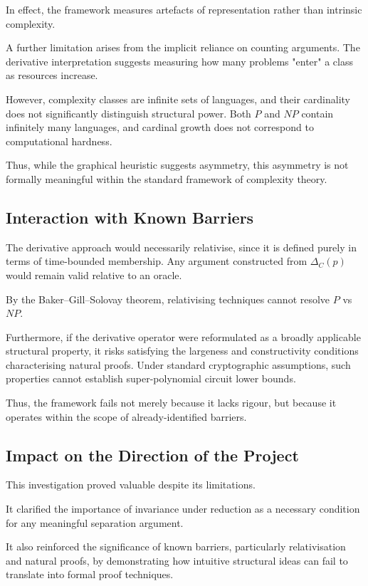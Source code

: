 \documentclass[12pt]{article}
\begin{document}
In effect, the framework measures artefacts of representation rather than intrinsic complexity.

A further limitation arises from the implicit reliance on counting arguments. The derivative interpretation suggests measuring how many problems "enter" a class as resources increase.

However, complexity classes are infinite sets of languages, and their cardinality does not significantly distinguish structural power. Both $P$ and $NP$ contain infinitely many languages, and cardinal growth does not correspond to computational hardness.

Thus, while the graphical heuristic suggests asymmetry, this asymmetry is not formally meaningful within the standard framework of complexity theory.

\subsection{Interaction with Known Barriers}

The derivative approach would necessarily relativise, since it is defined purely in terms of time-bounded membership. Any argument constructed from $\Delta_C(p)$ would remain valid relative to an oracle.

By the Baker–Gill–Solovay theorem, relativising techniques cannot resolve $P$ vs $NP$.

Furthermore, if the derivative operator were reformulated as a broadly applicable structural property, it risks satisfying the largeness and constructivity conditions characterising natural proofs. Under standard cryptographic assumptions, such properties cannot establish super-polynomial circuit lower bounds.

Thus, the framework fails not merely because it lacks rigour, but because it operates within the scope of already-identified barriers.

\subsection{Impact on the Direction of the Project}

This investigation proved valuable despite its limitations.

It clarified the importance of invariance under reduction as a necessary condition for any meaningful separation argument.

It also reinforced the significance of known barriers, particularly relativisation and natural proofs, by demonstrating how intuitive structural ideas can fail to translate into formal proof techniques.
\end{document}
